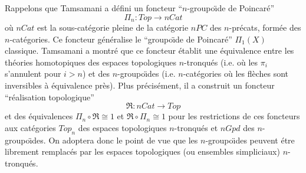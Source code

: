 \documentclass[12pt]{article}
\begin{document}
Rappelons que Tamsamani \cite{Tamsamani} a d\'efini un foncteur
``$n$-groupo\"{\i}de
de Poincar\'e''
$$
\Pi _n : Top \rightarrow nCat
$$
o\`u $nCat$ est la sous-cat\'egorie pleine de la cat\'egorie $nPC$ des
$n$-pr\'ecats, form\'ee des $n$-cat\'egories. Ce foncteur g\'en\'eralise
le ``groupo\"{\i}de de Poincar\'e'' $\Pi _1(X)$ classique. Tamsamani a
montr\'e que
ce foncteur \'etablit une \'equivalence entre les th\'eories homotopiques
des espaces topologiques $n$-tronqu\'es (i.e. o\`u les $\pi _i$ s'annulent pour
$i>n$) et des $n$-groupo\"{\i}des (i.e. $n$-cat\'egories o\`u les fl\`eches sont
inversibles \`a \'equivalence pr\`es). Plus pr\'ecis\'ement, il a construit un
foncteur ``r\'ealisation topologique''
$$
\Re : nCat \rightarrow Top
$$
et des \'equivalences  $\Pi _n \circ \Re\cong 1$ et $\Re \circ \Pi _n \cong 1$
pour les restrictions de ces foncteurs aux cat\'egories $Top _n$ des espaces
topologiques $n$-tronqu\'es et $nGpd$ des $n$-groupo\"{\i}des. On adoptera
donc le
point de vue que les $n$-groupo\"{\i}des peuvent \'etre librement
remplac\'es par
les espaces topologiques (ou ensembles simpliciaux) $n$-tronqu\'es.
\end{document}
